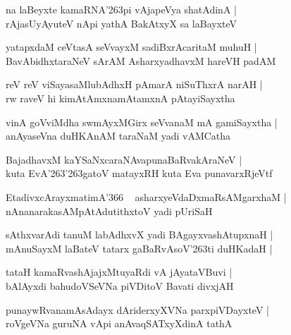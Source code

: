 \documentclass[twoside,12pt,openright]{book}
\def\S{\char'263}
\newcounter{shloka}[chapter]
\begin{document}
\begin{shloka}
na laBeyxte kamaRNA\S pi vAjapeVya shatAdinA |\\
rAjasUyAyuteV nApi yathA BakAtxyX sa laBayxteV 
\end{shloka}

\begin{shloka}
yatapxdaM ceVtasA seVvayxM sadiBxrAcaritaM muhuH |\\
BavAbidhxtaraNeV sArAM AsharxyadhavxM hareVH padAM 
\end{shloka}

\begin{shloka}
reV reV viSayasaMlubAdhxH pAmarA niSuThxrA narAH |\\
rw raveV hi kimAtAmxnamAtamxnA pAtayiSayxtha
\end{shloka}

\begin{shloka}
vinA goVviMdha swmAyxMGirx seVvanaM mA gamiSayxtha |\\
anAyaseVna duHKAnAM taraNaM yadi vAMCatha 
\end{shloka}

\begin{shloka}
BajadhavxM kaYSaNxcaraNAvapunaBaRvakAraNeV |\\
kuta EvA\S\S gatoV matayxRH kuta Eva punavarxRjeVtf 
\end{shloka}

\begin{shloka}
EtadivxcArayxmatimA\char'366 ~ asharxyeVdaDxmaRsAMgarxhaM |\\
nAnanarakasAMpAtAdutithxtoV  yadi pUriSaH 
\end{shloka}

\begin{shloka}
sAthxvarAdi tanuM labAdhxvX yadi BAgayxvashAtupxnaH |\\
mAnuSayxM laBateV tatarx gaBaRvAsoV\S ti duHKadaH |
\end{shloka}

\begin{shloka}
tataH kamaRvashAjajxMtuyaRdi vA jAyataVBuvi |\\
bAlAyxdi bahudoVSeVNa piVDitoV Bavati divxjAH 
\end{shloka}

\begin{shloka}
punaywRvanamAsAdayx dAriderxyXVNa parxpiVDayxteV |\\
roVgeVNa guruNA vApi anAvaqSATxyXdinA tathA 
\end{shloka}
\end{document}

